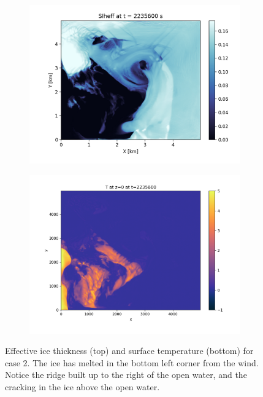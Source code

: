 \documentclass[11pt]{article}
\begin{document}
\clearpage
\begin{figure}[h!]
\begin{subfigure}{0.8\linewidth}
\centering
\includegraphics[width=\linewidth]{iceMelt/icemeltsmooth-surface-ice-thick-0001117800}
\end{subfigure}
\begin{subfigure}{0.8\linewidth}
\includegraphics[width=\linewidth]{iceMelt/icemeltsmooth-surface-T-0001117800}
\end{subfigure}
\caption{Effective ice thickness (top) and surface temperature (bottom) for case 2. The ice has melted in the bottom left corner from the wind. Notice the ridge built up to the right of the open water, and the cracking in the ice above the open water.}
\label{fig:iceMelt0}
\end{figure}
\end{document}
